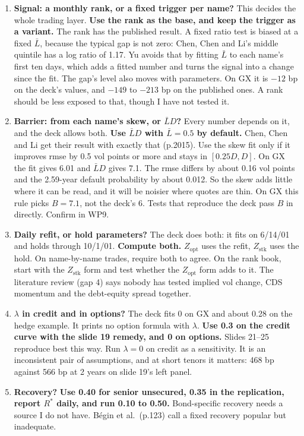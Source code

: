 \documentclass[10pt,a4paper]{article}
\newcommand{\Lbar}{\bar{L}}
\newcommand{\Zo}{Z_{\mathrm{opt}}}
\newcommand{\Zs}{Z_{\mathrm{stk}}}
\begin{document}
\begin{enumerate}[itemsep=3pt]
\item \textbf{Signal: a monthly rank, or a fixed trigger per name?} This decides the whole trading layer. \textbf{Use the rank as the base, and keep the trigger as a variant.} The rank has the published result. A fixed ratio test is biased at a fixed $\Lbar$, because the typical gap is not zero: Chen, Chen and Li's middle quintile has a log ratio of 1.17. Yu avoids that by fitting $\Lbar$ to each name's first ten days, which adds a fitted number and turns the signal into a change since the fit. The gap's level also moves with parameters. On GX it is $-12$ bp on the deck's values, and $-149$ to $-213$ bp on the published ones. A rank should be less exposed to that, though I have not tested it.
\item \textbf{Barrier: from each name's skew, or $\Lbar D$?} Every number depends on it, and the deck allows both. \textbf{Use $\Lbar D$ with $\Lbar=0.5$ by default.} Chen, Chen and Li get their result with exactly that (p.2015). Use the skew fit only if it improves rmse by 0.5 vol points or more and stays in $[0.25D,D]$. On GX the fit gives 6.01 and $\Lbar D$ gives 7.1. The rmse differs by about 0.16 vol points and the 2.59-year default probability by about 0.012. So the skew adds little where it can be read, and it will be noisier where quotes are thin. On GX this rule picks $B=7.1$, not the deck's 6. Tests that reproduce the deck pass $B$ in directly. Confirm in WP9.
\item \textbf{Daily refit, or hold parameters?} The deck does both: it fits on 6/14/01 and holds through 10/1/01. \textbf{Compute both.} $\Zo$ uses the refit, $\Zs$ uses the hold. On name-by-name trades, require both to agree. On the rank book, start with the $\Zs$ form and test whether the $\Zo$ form adds to it. The literature review (gap 4) says nobody has tested implied vol change, CDS momentum and the debt-equity spread together.
\item \textbf{$\lambda$ in credit and in options?} The deck fits 0 on GX and about 0.28 on the hedge example. It prints no option formula with $\lambda$. \textbf{Use 0.3 on the credit curve with the slide 19 remedy, and 0 on options.} Slides 21--25 reproduce best this way. Run $\lambda=0$ on credit as a sensitivity. It is an inconsistent pair of assumptions, and at short tenors it matters: 468 bp against 566 bp at 2 years on slide 19's left panel.
\item \textbf{Recovery?} \textbf{Use 0.40 for senior unsecured, 0.35 in the replication, report $R^*$ daily, and run 0.10 to 0.50.} Bond-specific recovery needs a source I do not have. B\'egin et al.\ (p.123) call a fixed recovery popular but inadequate.

\end{enumerate}
\end{document}
